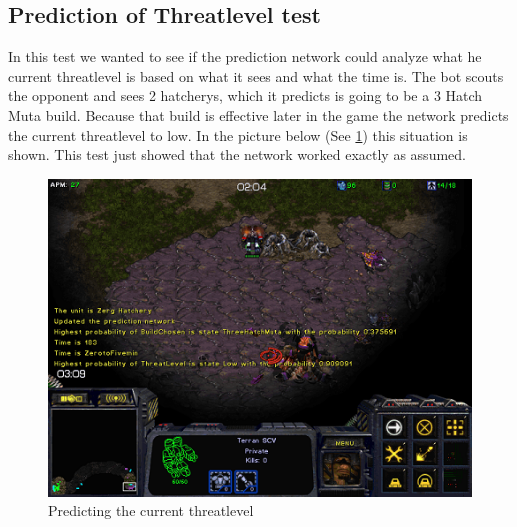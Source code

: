 	\subsection{Prediction of Threatlevel test}
		In this test we wanted to see if the prediction network could analyze what he current threatlevel is based on what it sees and what the time is.
		The bot scouts the opponent and sees 2 hatcherys, which it predicts is going to be a 3 Hatch Muta build. Because that build is effective later 
		in the game the network predicts the current threatlevel to low. In the picture below (See \ref{fig:predicting}) this situation is shown. 
		This test just showed that the network worked exactly as assumed.
		\begin{figure}[H]
			\includegraphics[scale=1]{Figures/BuildOrderPredictorTest/threatlevel.png}
			\caption{Predicting the current threatlevel}\label{fig:predicting}
		\end{figure}